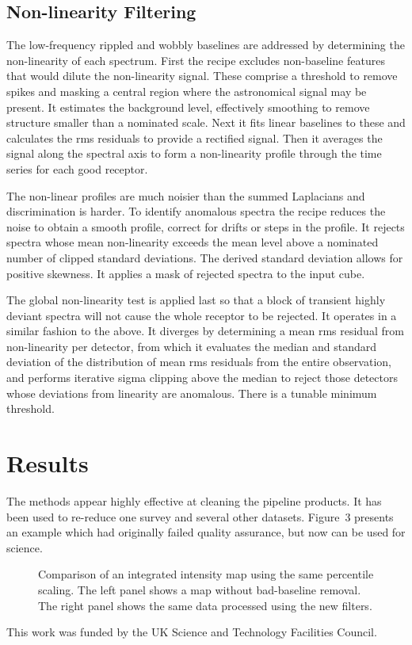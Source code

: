 \subsection{Non-linearity Filtering}

The low-frequency rippled and wobbly baselines are addressed by determining the non-linearity of each spectrum.  First the recipe excludes non-baseline features that would dilute the non-linearity signal.  These comprise a threshold to remove spikes and masking a central region where the astronomical signal may be present. It estimates the background level, effectively smoothing to remove structure smaller than a nominated scale.  Next it fits linear baselines to these and calculates the rms residuals to provide a rectified signal.  Then it averages the signal along the spectral axis to form a non-linearity profile through the time series for each good receptor.

The non-linear profiles are much noisier than the summed Laplacians and discrimination is harder.  To identify anomalous spectra the recipe reduces the noise to obtain a smooth profile, correct for drifts or steps in the profile.  It rejects spectra whose mean non-linearity exceeds the mean level above a nominated number of clipped standard deviations.  The derived standard deviation allows for positive skewness.  It applies a mask of rejected spectra to the input cube.

The global non-linearity test is applied last so that a block of transient highly deviant spectra will not cause the whole receptor to be rejected.  It operates in a similar fashion to the above.  It diverges by determining a mean rms residual from non-linearity per detector, from which it evaluates the median and standard deviation of the distribution of mean rms residuals from the entire observation, and performs iterative sigma clipping above the median to reject those detectors whose deviations from linearity are anomalous.  There is a tunable minimum threshold.

\section{Results}

The methods appear highly effective at cleaning the pipeline products. It has been used to re-reduce one survey and several other datasets. Figure~3 presents an example which had originally failed quality assurance, but now can be used for science. 

\begin{figure}[!ht]
\caption{Comparison of an integrated intensity map using the same percentile scaling.  The left panel shows a map without bad-baseline removal.  The right panel shows the same data processed using the new filters.}
\end{figure}

\acknowledgements This work was funded by the UK Science and Technology Facilities Council.


